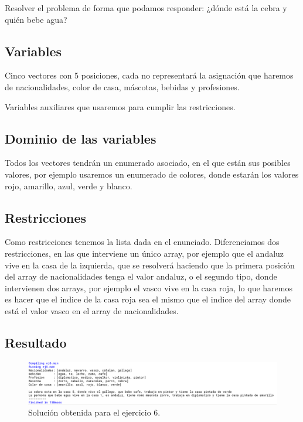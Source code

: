 \documentclass[11pt, spanish]{article}
\begin{document}
Resolver el problema de forma que podamos responder: ¿dónde está la cebra y quién bebe agua?

\subsection{Variables}

Cinco vectores con 5 posiciones, cada no representará la asignación que haremos de nacionalidades, color de casa, máscotas, bebidas y profesiones.

Variables auxiliares que usaremos para cumplir las restricciones.

\subsection{Dominio de las variables}

Todos los vectores tendrán un enumerado asociado, en el que están sus posibles valores, por ejemplo usaremos un enumerado de colores, donde estarán los valores rojo, amarillo, azul, verde y blanco.

\subsection{Restricciones}

Como restricciones tenemos la lista dada en el enunciado. Diferenciamos dos restricciones, en las que interviene un único array, por ejemplo que el andaluz vive en la casa de la izquierda, que se resolverá haciendo que la primera posición del array de nacionalidades tenga el valor andaluz, o el segundo tipo, donde intervienen dos arrays, por ejemplo el vasco vive en la casa roja, lo que haremos es hacer que el indice de la casa roja sea el mismo que el indice del array donde está el valor vasco en el array de nacionalidades.

\subsection{Resultado}


\begin{figure}[H]
  \centering
      \includegraphics[scale = 0.30]{sol6.png}
 		 \caption{Solución obtenida para el ejercicio 6.}
  		\label{fig:ej6}

\end{figure}
\end{document}
